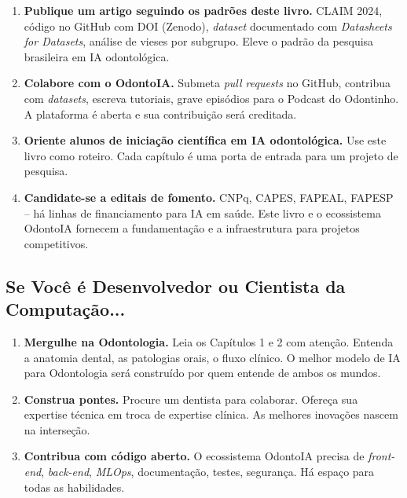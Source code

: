 \begin{enumerate}
  \item \textbf{Publique um artigo seguindo os padrões deste livro.} CLAIM 2024,
    código no GitHub com DOI (Zenodo), \textit{dataset} documentado com
    \textit{Datasheets for Datasets}, análise de vieses por subgrupo. Eleve o
    padrão da pesquisa brasileira em IA odontológica.

  \item \textbf{Colabore com o OdontoIA.} Submeta \textit{pull requests} no
    GitHub, contribua com \textit{datasets}, escreva tutoriais, grave episódios
    para o Podcast do Odontinho. A plataforma é aberta e sua contribuição será
    creditada.

  \item \textbf{Oriente alunos de iniciação científica em IA odontológica.}
    Use este livro como roteiro. Cada capítulo é uma porta de entrada para um
    projeto de pesquisa.

  \item \textbf{Candidate-se a editais de fomento.} CNPq, CAPES, FAPEAL,
    FAPESP -- há linhas de financiamento para IA em saúde. Este livro e o
    ecossistema OdontoIA fornecem a fundamentação e a infraestrutura para
    projetos competitivos.
\end{enumerate}

\subsection{Se Você é Desenvolvedor ou Cientista da Computação...}

\begin{enumerate}
  \item \textbf{Mergulhe na Odontologia.} Leia os Capítulos 1 e 2 com atenção.
    Entenda a anatomia dental, as patologias orais, o fluxo clínico. O melhor
    modelo de IA para Odontologia será construído por quem entende de ambos os
    mundos.

  \item \textbf{Construa pontes.} Procure um dentista para colaborar. Ofereça
    sua expertise técnica em troca de expertise clínica. As melhores inovações
    nascem na interseção.

  \item \textbf{Contribua com código aberto.} O ecossistema OdontoIA precisa
    de \textit{front-end}, \textit{back-end}, \textit{MLOps}, documentação,
    testes, segurança. Há espaço para todas as habilidades.
\end{enumerate}

